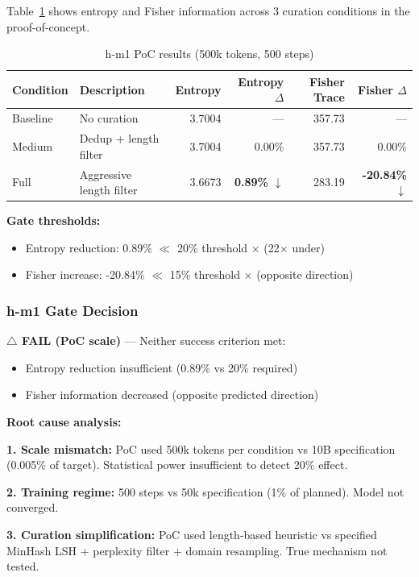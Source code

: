 Table~\ref{tab:h-m1-poc} shows entropy and Fisher information across 3 curation conditions in the proof-of-concept.

\begin{table}[h]
\centering
\small
\begin{tabular}{llrrrr}
\hline
\textbf{Condition} & \textbf{Description} & \textbf{Entropy} & \textbf{Entropy $\Delta$} & \textbf{Fisher Trace} & \textbf{Fisher $\Delta$} \\
\hline
Baseline & No curation & 3.7004 & --- & 357.73 & --- \\
Medium & Dedup + length filter & 3.7004 & 0.00\% & 357.73 & 0.00\% \\
Full & Aggressive length filter & 3.6673 & \textbf{0.89\%} $\downarrow$ & 283.19 & \textbf{-20.84\%} $\downarrow$ \\
\hline
\end{tabular}
\caption{h-m1 PoC results (500k tokens, 500 steps)}
\label{tab:h-m1-poc}
\end{table}

\textbf{Gate thresholds:}
\begin{itemize}
\item Entropy reduction: 0.89\% $\ll$ 20\% threshold $\times$ (22$\times$ under)
\item Fisher increase: -20.84\% $\ll$ 15\% threshold $\times$ (opposite direction)
\end{itemize}

\subsubsection{h-m1 Gate Decision}

\textbf{$\triangle$ FAIL (PoC scale)} --- Neither success criterion met:
\begin{itemize}
\item Entropy reduction insufficient (0.89\% vs 20\% required)
\item Fisher information decreased (opposite predicted direction)
\end{itemize}

\textbf{Root cause analysis:}

\textbf{1. Scale mismatch:} PoC used 500k tokens per condition vs 10B specification (0.005\% of target). Statistical power insufficient to detect 20\% effect.

\textbf{2. Training regime:} 500 steps vs 50k specification (1\% of planned). Model not converged.

\textbf{3. Curation simplification:} PoC used length-based heuristic vs specified MinHash LSH + perplexity filter + domain resampling. True mechanism not tested.

